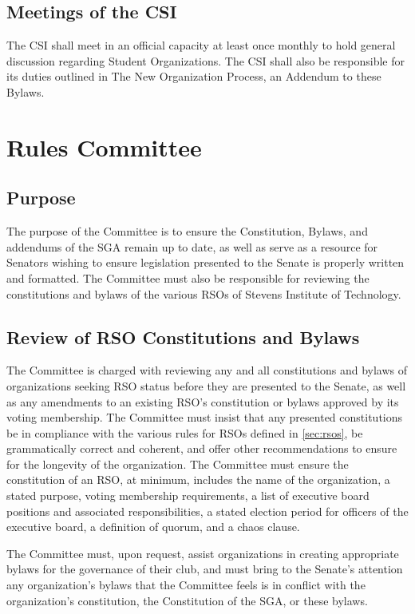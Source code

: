 \documentclass[12pt]{scrreprt}
\begin{document}
\subsection{Meetings of the CSI}
The CSI shall meet in an official capacity at least once monthly to hold general discussion regarding Student Organizations.
The CSI shall also be responsible for its duties outlined in The New Organization Process, an 
Addendum to these Bylaws.

\section{Rules Committee}

\subsection{Purpose}
The purpose of the Committee is to ensure the Constitution, Bylaws, and addendums of the SGA remain up
to date, as well as serve as a resource for Senators wishing to ensure legislation presented to the Senate is properly written and formatted. The Committee must also be responsible for reviewing the constitutions and bylaws of the various RSOs of Stevens Institute of Technology.

\subsection{Review of RSO Constitutions and Bylaws}
The Committee is charged with reviewing any and all constitutions and bylaws of organizations seeking RSO status before they are presented to the Senate, as well as any amendments to an existing RSO’s constitution or bylaws approved by its voting membership. The Committee must insist that any presented constitutions be in compliance with the various rules for RSOs defined in 
\ref{sec:rsos}, be grammatically correct and coherent, and offer other recommendations to ensure for the longevity of the organization. The Committee must ensure the constitution of an RSO, at minimum, includes the name of the organization, a stated purpose, voting membership requirements, a list of executive board positions and associated responsibilities, a stated election period for officers of the executive board, a definition of quorum, and a chaos clause.

The Committee must, upon request, assist organizations in creating appropriate bylaws for the governance of their club, and must bring to the Senate's attention any organization's bylaws
that the Committee feels is in conflict with the organization's constitution, the Constitution of
the SGA, or these bylaws.
\end{document}
